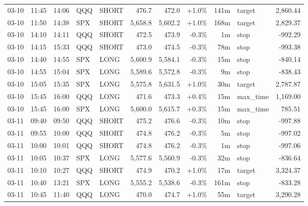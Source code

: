 \documentclass[11pt,a4paper,twoside]{article}
\begin{document}
\begin{center}
\begin{longtable}{>{\color{txtmain}}l l l l l r r r r >{\color{txtmain}}l r}
03-10 & 11:45 & 14:06 & QQQ & SHORT & 476.7 & 472.0 & \textcolor{wingreen}{+1.0\%} & 141m & target & \textcolor{wingreen}{2,860.44} \\
03-10 & 11:50 & 14:38 & SPX & SHORT & 5,658.8 & 5,602.2 & \textcolor{wingreen}{+1.0\%} & 168m & target & \textcolor{wingreen}{2,829.37} \\
03-10 & 14:10 & 14:11 & QQQ & SHORT & 472.5 & 473.9 & \textcolor{lossred}{-0.3\%} & 1m & stop & \textcolor{lossred}{-992.29} \\
03-10 & 14:15 & 15:33 & QQQ & SHORT & 473.0 & 474.5 & \textcolor{lossred}{-0.3\%} & 78m & stop & \textcolor{lossred}{-993.38} \\
03-10 & 14:40 & 14:55 & SPX & LONG & 5,600.9 & 5,584.1 & \textcolor{lossred}{-0.3\%} & 15m & stop & \textcolor{lossred}{-840.14} \\
03-10 & 14:55 & 15:04 & SPX & LONG & 5,589.6 & 5,572.8 & \textcolor{lossred}{-0.3\%} & 9m & stop & \textcolor{lossred}{-838.43} \\
03-10 & 15:05 & 15:35 & SPX & LONG & 5,575.8 & 5,631.5 & \textcolor{wingreen}{+1.0\%} & 30m & target & \textcolor{wingreen}{2,787.87} \\
03-10 & 15:45 & 16:00 & QQQ & LONG & 471.6 & 473.3 & \textcolor{wingreen}{+0.4\%} & 15m & max\_time & \textcolor{wingreen}{1,169.00} \\
03-10 & 15:45 & 16:00 & SPX & LONG & 5,600.0 & 5,615.7 & \textcolor{wingreen}{+0.3\%} & 15m & max\_time & \textcolor{wingreen}{785.51} \\
03-11 & 09:40 & 09:50 & QQQ & SHORT & 475.2 & 476.6 & \textcolor{lossred}{-0.3\%} & 10m & stop & \textcolor{lossred}{-997.88} \\
03-11 & 09:55 & 10:00 & QQQ & SHORT & 474.8 & 476.2 & \textcolor{lossred}{-0.3\%} & 5m & stop & \textcolor{lossred}{-997.02} \\
03-11 & 10:00 & 10:01 & QQQ & SHORT & 474.8 & 476.2 & \textcolor{lossred}{-0.3\%} & 1m & stop & \textcolor{lossred}{-997.06} \\
03-11 & 10:05 & 10:37 & SPX & LONG & 5,577.6 & 5,560.9 & \textcolor{lossred}{-0.3\%} & 32m & stop & \textcolor{lossred}{-836.64} \\
03-11 & 10:10 & 10:27 & QQQ & SHORT & 474.9 & 470.2 & \textcolor{wingreen}{+1.0\%} & 17m & target & \textcolor{wingreen}{3,324.37} \\
03-11 & 10:40 & 13:21 & SPX & LONG & 5,555.2 & 5,538.6 & \textcolor{lossred}{-0.3\%} & 161m & stop & \textcolor{lossred}{-833.28} \\
03-11 & 10:45 & 11:40 & QQQ & LONG & 470.0 & 474.7 & \textcolor{wingreen}{+1.0\%} & 55m & target & \textcolor{wingreen}{3,290.28} \\

\end{longtable}
\end{center}
\end{document}
